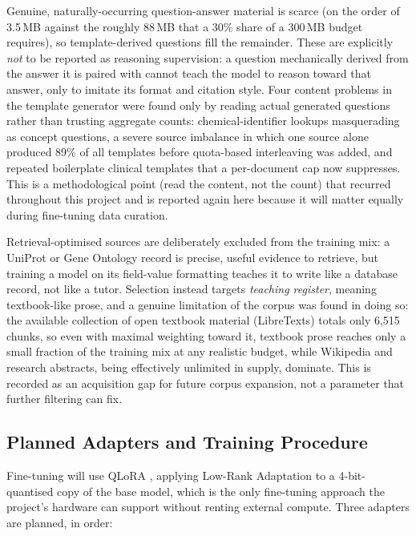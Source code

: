 Genuine, naturally-occurring question-answer material is scarce (on the
order of 3.5\,MB against the roughly 88\,MB that a 30\% share of a
300\,MB budget requires), so template-derived questions fill the
remainder. These are explicitly \emph{not} to be reported as reasoning
supervision: a question mechanically derived from the answer it is paired
with cannot teach the model to reason toward that answer, only to imitate
its format and citation style. Four content problems in the template
generator were found only by reading actual generated questions rather
than trusting aggregate counts: chemical-identifier lookups masquerading
as concept questions, a severe source imbalance in which one source alone
produced 89\% of all templates before quota-based interleaving was added,
and repeated boilerplate clinical templates that a per-document cap now
suppresses. This is a methodological point (read the content, not the
count) that recurred throughout this project and is reported again here
because it will matter equally during fine-tuning data curation.

Retrieval-optimised sources are deliberately excluded from the training
mix: a UniProt or Gene Ontology record is precise, useful evidence to
retrieve, but training a model on its field-value formatting teaches it to
write like a database record, not like a tutor. Selection instead targets
\emph{teaching register}, meaning textbook-like prose, and a genuine
limitation of the corpus was found in doing so: the available collection
of open textbook material (LibreTexts) totals only 6{,}515 chunks, so even
with maximal weighting toward it, textbook prose reaches only a small
fraction of the training mix at any realistic budget, while Wikipedia and
research abstracts, being effectively unlimited in supply, dominate. This
is recorded as an acquisition gap for future corpus expansion, not a
parameter that further filtering can fix.

\subsection{Planned Adapters and Training Procedure}\label{5.3.3}

Fine-tuning will use QLoRA \cite{dettmers2023qlora}, applying Low-Rank
Adaptation \cite{hu2021lora} to a 4-bit-quantised copy of the base model,
which is the only fine-tuning approach the project's hardware can support
without renting external compute. Three adapters are planned, in order:

